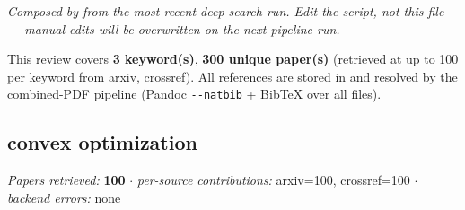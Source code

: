 \documentclass[
  english,
]{article}
\newcounter{none} %
\begin{document}
\emph{Composed by 
from the most recent deep-search run. Edit the script, not this file ---
manual edits will be overwritten on the next pipeline run.}

This review covers \textbf{3 keyword(s)}, \textbf{300 unique paper(s)}
(retrieved at up to 100 per keyword from arxiv, crossref). All
references are stored in  and
resolved by the combined-PDF pipeline (Pandoc \texttt{-\/-natbib} +
BibTeX over all  files).

\subsection{convex optimization}\label{convex-optimization}

\emph{Papers retrieved:} \textbf{100} \texorpdfstring{\ensuremath{\cdot}}{.} \emph{per-source contributions:}
arxiv=100, crossref=100 \texorpdfstring{\ensuremath{\cdot}}{.} \emph{backend errors:} none
\end{document}
